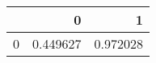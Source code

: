 \begin{tabular}{lrr}
\toprule
{} &         0 &         1 \\
\midrule
0 &  0.449627 &  0.972028 \\
\bottomrule
\end{tabular}
